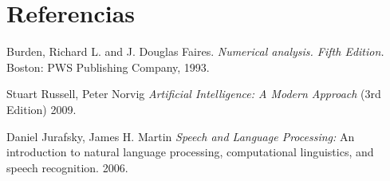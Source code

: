 \documentclass[11pt, a4paper]{article}
\begin{document}


\tableofcontents
\newpage




\newpage


\section{Referencias}

\begin{thebibliography}{999}

      Burden, Richard L. and J. Douglas Faires.
      \emph{Numerical analysis. Fifth Edition.}
      Boston: PWS Publishing Company,
      1993.

      Stuart Russell, Peter Norvig
      \emph{Artificial Intelligence: A Modern Approach}
      (3rd Edition)
      2009.

      Daniel Jurafsky, James H. Martin
      \emph{Speech and Language Processing:} An introduction to natural language processing,
      computational linguistics, and speech recognition.
      2006.
      
\end{thebibliography}
\end{document}
